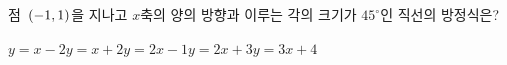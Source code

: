 점~$(-1{,}\mkern3mu 1)$을 지나고 $x$축의 양의 방향과 이루는 각의 크기가 $45^\circ$인 직선의 방정식은?
\begin{choices32}{$y=x-2$}{$y=x+2$}{$y=2x-1$}{$y=2x+3$}{$y=3x+4$}\end{choices32}
